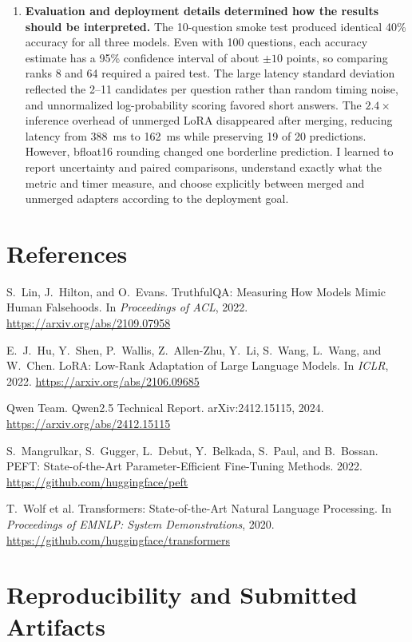 \documentclass[11pt]{article}
\begin{document}
\begin{enumerate}[label=\textbf{Point \arabic*:},leftmargin=*,itemsep=0.8em]
  \item \textbf{Evaluation and deployment details determined how the results should be interpreted.} The 10-question smoke test produced identical 40\% accuracy for all three models. Even with 100 questions, each accuracy estimate has a 95\% confidence interval of about $\pm 10$ points, so comparing ranks 8 and 64 required a paired test. The large latency standard deviation reflected the 2--11 candidates per question rather than random timing noise, and unnormalized log-probability scoring favored short answers. The $2.4\times$ inference overhead of unmerged LoRA disappeared after merging, reducing latency from 388~ms to 162~ms while preserving 19 of 20 predictions. However, bfloat16 rounding changed one borderline prediction. I learned to report uncertainty and paired comparisons, understand exactly what the metric and timer measure, and choose explicitly between merged and unmerged adapters according to the deployment goal.
\end{enumerate}

\section*{References}

\begin{enumerate}[label={[\arabic*]},leftmargin=2em,itemsep=0.2em]
  \item S.~Lin, J.~Hilton, and O.~Evans. TruthfulQA: Measuring How Models Mimic Human Falsehoods. In \emph{Proceedings of ACL}, 2022. \url{https://arxiv.org/abs/2109.07958}
  \item E.~J.~Hu, Y.~Shen, P.~Wallis, Z.~Allen-Zhu, Y.~Li, S.~Wang, L.~Wang, and W.~Chen. LoRA: Low-Rank Adaptation of Large Language Models. In \emph{ICLR}, 2022. \url{https://arxiv.org/abs/2106.09685}
  \item Qwen Team. Qwen2.5 Technical Report. arXiv:2412.15115, 2024. \url{https://arxiv.org/abs/2412.15115}
  \item S.~Mangrulkar, S.~Gugger, L.~Debut, Y.~Belkada, S.~Paul, and B.~Bossan. PEFT: State-of-the-Art Parameter-Efficient Fine-Tuning Methods. 2022. \url{https://github.com/huggingface/peft}
  \item T.~Wolf et al. Transformers: State-of-the-Art Natural Language Processing. In \emph{Proceedings of EMNLP: System Demonstrations}, 2020. \url{https://github.com/huggingface/transformers}
\end{enumerate}

\section*{Reproducibility and Submitted Artifacts}
\end{document}
